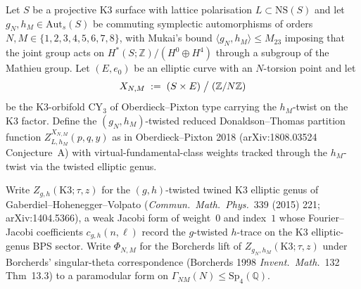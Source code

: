 \begin{conjecture}
\label{conj:twisted-twined-bkm-ladder-gritsenko-clery}
Let $S$ be a projective K3 surface with lattice polarisation
$L \subset \mathrm{NS}(S)$ and let
$g_N, h_M \in \mathrm{Aut}_s(S)$ be commuting symplectic automorphisms
of orders $N, M \in \{1, 2, 3, 4, 5, 6, 7, 8\}$, with Mukai's bound
$\langle g_N, h_M \rangle \leq M_{23}$ imposing that the joint group
acts on $H^*(S; \mathbb{Z}) / (H^0 \oplus H^4)$ through a subgroup of
the Mathieu group. Let $(E, e_0)$ be an elliptic curve with an
$N$-torsion point and let
\[
 X_{N, M} \;:=\; (S \times E) \bigm/ (\mathbb{Z}/N\mathbb{Z})
\]
be the K3-orbifold CY$_3$ of Oberdieck--Pixton type carrying the
$h_M$-twist on the K3 factor. Define the $(g_N, h_M)$-twisted reduced
Donaldson--Thomas partition function $Z^{X_{N,M}}_{L, h_M}(p, q, y)$
as in Oberdieck--Pixton 2018 (arXiv:1808.03524 Conjecture~A) with
virtual-fundamental-class weights tracked through the $h_M$-twist via
the twisted elliptic genus.

Write $Z_{g, h}(\mathrm{K3}; \tau, z)$ for the $(g, h)$-twisted twined
K3 elliptic genus of Gaberdiel--Hohenegger--Volpato
(\emph{Commun.\ Math.\ Phys.}~339 (2015) 221; arXiv:1404.5366), a
weak Jacobi form of weight~$0$ and index~$1$ whose Fourier--Jacobi
coefficients $c_{g, h}(n, \ell)$ record the $g$-twisted $h$-trace on
the K3 elliptic-genus BPS sector. Write $\Phi_{N, M}$ for the
Borcherds lift of $Z_{g_N, h_M}(\mathrm{K3}; \tau, z)$ under
Borcherds' singular-theta correspondence (Borcherds 1998
\emph{Invent.\ Math.}~132 Thm~13.3) to a paramodular form on
$\Gamma_{N M}(N) \leq \mathrm{Sp}_4(\mathbb{Q})$.


\end{conjecture}
